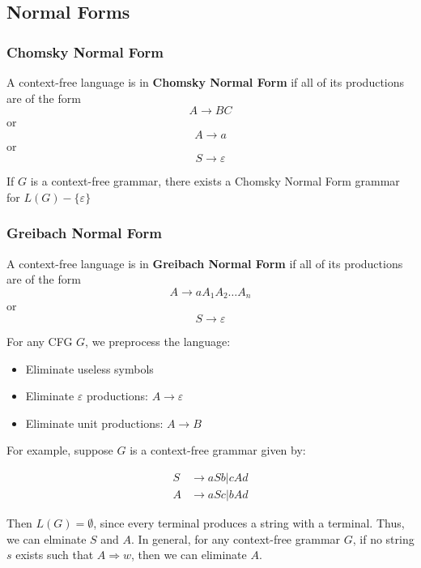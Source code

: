 \subsection{Normal Forms}\label{subsec:normal-forms}
\subsubsection{Chomsky Normal Form}\label{subsubsec:chomsky-normal-form}
\begin{definition}
    A context-free language is in \textbf{Chomsky Normal Form} if all of its productions are of the form 
    \[A \to BC\]
    or
    \[A \to a\]
    or
    \[S\to\varepsilon \]
\end{definition}

\begin{theorem}
    If \(G\) is a context-free grammar, there exists a Chomsky Normal Form grammar for \(L(G)-\{\varepsilon \} \)
\end{theorem}

\subsubsection{Greibach Normal Form}
\begin{definition}
    A context-free language is in \textbf{Greibach Normal Form} if all of its productions are of the form
    \[A\to aA_1A_2\hdots A_n\]
    or 
    \[S\to\varepsilon \]
\end{definition}

For any CFG \(G\), we preprocess the language:

\begin{itemize}
    \item Eliminate useless symbols
    \item Eliminate \(\varepsilon \) productions: \(A\to\varepsilon \)
    \item Eliminate unit productions: \(A\to B\)
\end{itemize}

For example, suppose \(G\) is a context-free grammar given by:\@

\begin{align*}
    S &\to aSb|cAd\\
    A &\to aSc|bAd 
\end{align*}

Then \(L(G)=\emptyset \), since every terminal produces a string with a terminal. Thus, we can elminate \(S\) and \(A\). In general, for any context-free grammar $G$, if no string $s$ exists such that \(A\Rightarrow w\), then we can eliminate \(A\). 

